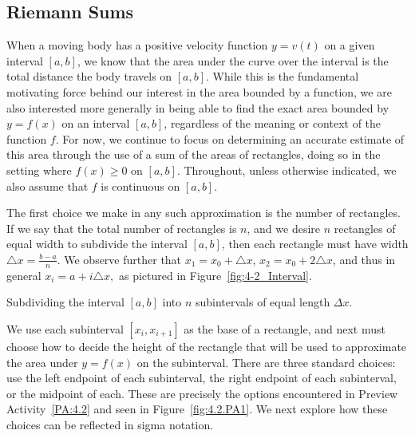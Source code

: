 
\subsection*{Riemann Sums}

When a moving body has a positive velocity function $y = v(t)$ on a given interval $[a,b]$, we know that the area under the curve over the interval is the total distance the body travels on $[a,b]$.  While this is the fundamental motivating force behind our interest in the area bounded by a function, we are also interested more generally in being able to find the exact area bounded by $y = f(x)$ on an interval $[a,b]$, regardless of the meaning or context of the function $f$.  For now, we continue to focus on determining an accurate estimate of this area through the use of a sum of the areas of rectangles, doing so in the setting where $f(x) \ge 0$ on $[a,b]$.  Throughout, unless otherwise indicated, we also assume that $f$ is continuous on $[a,b]$.

The first choice we make in any such approximation is the number of rectangles.  If we say that the total number of rectangles is $n$, and we desire $n$ rectangles of equal width to subdivide the interval $[a,b]$, then each rectangle must have width $\triangle x = \frac{b-a}{n}$. We observe further that $x_1 = x_0 + \triangle x$, $x_2 = x_0 + 2 \triangle x$, and thus in general $x_{i} = a + i\triangle x,$ as pictured in Figure~\ref{fig:4-2_Interval}.

\begin{marginfigure} %
\caption{Subdividing the interval $[a,b]$ into $n$ subintervals of equal length $\Delta x$.} \label{fig:4-2_Interval}
\end{marginfigure}

We use each subinterval $[x_i, x_{i+1}]$ as the base of a rectangle, and next must choose how to decide the height of the rectangle that will be used to approximate the area under $y = f(x)$ on the subinterval.  There are three standard choices:  use the left endpoint of each subinterval, the right endpoint of each subinterval, or the midpoint of each.  These are precisely the options encountered in Preview Activity~\ref{PA:4.2} and seen in Figure~\ref{fig:4.2.PA1}.  We next explore how these choices can be reflected in sigma notation.

